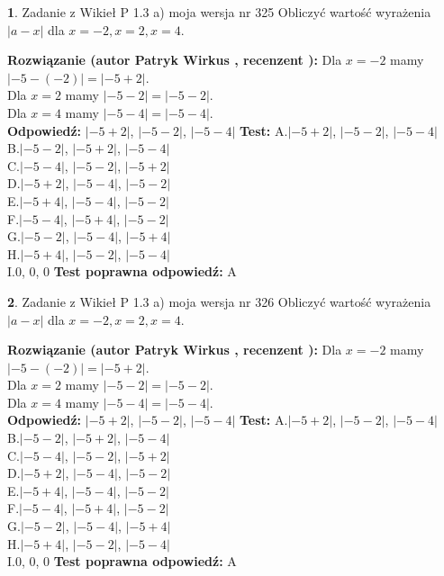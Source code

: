 \documentclass[12pt, a4paper]{article}
\theoremstyle{definition} %
\newtheorem{zad}{}
\newcommand{\zadStart}[1]{\begin{zad}#1\newline}
\newcommand{\zadStop}{\end{zad}}
\newcommand{\rozwStart}[2]{\noindent \textbf{Rozwiązanie (autor #1 , recenzent #2): }\newline}
\newcommand{\rozwStop}{\newline}
\newcommand{\odpStart}{\noindent \textbf{Odpowiedź:}\newline}
\newcommand{\odpStop}{\newline}
\newcommand{\testStart}{\noindent \textbf{Test:}\newline}
\newcommand{\testStop}{\newline}
\newcommand{\kluczStart}{\noindent \textbf{Test poprawna odpowiedź:}\newline}
\newcommand{\kluczStop}{\newline}
\begin{document}
\zadStart{Zadanie z Wikieł P 1.3 a) moja wersja nr 325}
Obliczyć wartość wyrażenia $|a - x|$ dla $x=-2,x=2,x=4$.
\zadStop
\rozwStart{Patryk Wirkus}{}
Dla $x = -2$ mamy $|-5 - (-2)| = |-5 + 2|$.\\
Dla $x = 2$ mamy $|-5 - 2| = |-5 - 2|$.\\
Dla $x = 4$ mamy $|-5 - 4| = |-5 - 4|$.\\
\rozwStop
\odpStart
$|-5 + 2|$, $|-5 - 2|$, $|-5 - 4|$
\odpStop
\testStart
A.$|-5 + 2|$, $|-5 - 2|$, $|-5 - 4|$\\
B.$|-5 - 2|$, $|-5 + 2|$, $|-5 - 4|$\\
C.$|-5 - 4|$, $|-5 - 2|$, $|-5 + 2|$\\
D.$|-5 + 2|$, $|-5 - 4|$, $|-5 - 2|$\\
E.$|-5 + 4|$, $|-5 - 4|$, $|-5 - 2|$\\
F.$|-5 - 4|$, $|-5 + 4|$, $|-5 - 2|$\\
G.$|-5 - 2|$, $|-5 - 4|$, $|-5 + 4|$\\
H.$|-5 + 4|$, $|-5 - 2|$, $|-5 - 4|$\\
I.$0$, $0$, $0$
\testStop
\kluczStart
A
\kluczStop



\zadStart{Zadanie z Wikieł P 1.3 a) moja wersja nr 326}
Obliczyć wartość wyrażenia $|a - x|$ dla $x=-2,x=2,x=4$.
\zadStop
\rozwStart{Patryk Wirkus}{}
Dla $x = -2$ mamy $|-5 - (-2)| = |-5 + 2|$.\\
Dla $x = 2$ mamy $|-5 - 2| = |-5 - 2|$.\\
Dla $x = 4$ mamy $|-5 - 4| = |-5 - 4|$.\\
\rozwStop
\odpStart
$|-5 + 2|$, $|-5 - 2|$, $|-5 - 4|$
\odpStop
\testStart
A.$|-5 + 2|$, $|-5 - 2|$, $|-5 - 4|$\\
B.$|-5 - 2|$, $|-5 + 2|$, $|-5 - 4|$\\
C.$|-5 - 4|$, $|-5 - 2|$, $|-5 + 2|$\\
D.$|-5 + 2|$, $|-5 - 4|$, $|-5 - 2|$\\
E.$|-5 + 4|$, $|-5 - 4|$, $|-5 - 2|$\\
F.$|-5 - 4|$, $|-5 + 4|$, $|-5 - 2|$\\
G.$|-5 - 2|$, $|-5 - 4|$, $|-5 + 4|$\\
H.$|-5 + 4|$, $|-5 - 2|$, $|-5 - 4|$\\
I.$0$, $0$, $0$
\testStop
\kluczStart
A
\kluczStop
\end{document}
